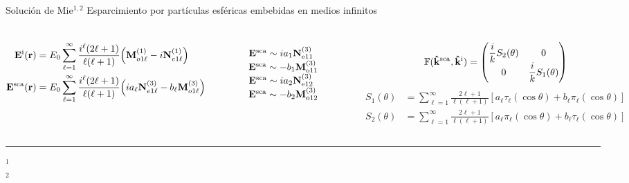 
\begin{frame}{Solución de Mie$^{1,2}$}
	{Esparcimiento por partículas esféricas embebidas en medios infinitos}
	\scriptsize
\vspace*{-2em}
	\begin{columns}
	 \scriptsize
	\begin{align*}
	\vb{E}^\text{i} (\vb{r}) &= E_0 \sum_{\ell = 1}^\infty\frac{i^\ell(2\ell+1)}{\ell(\ell+1)}\qty( \vb{M}_{o1\ell}^{(1)} -i \vb{N}_{e1\ell}^{(1)})\\
	\vb{E}^\text{sca} (\vb{r}) &= E_0 \sum_{\ell = 1}^\infty\frac{i^\ell(2\ell+1)}{\ell(\ell+1)}\qty(i a_\ell \vb{N}_{e1\ell}^{(3)} -b_\ell \vb{M}_{o1\ell}^{(3)})
	\end{align*}

	\begin{figure}
	    \fontsize{4}{5}\selectfont \hfill %
    $\vb{E}^\text{sca} \sim  i a_1 \vb{N}^{(3)}_{\text{e}11}$\hfill
    $\vb{E}^\text{sca} \sim  - b_1 \vb{M}^{(3)}_{\text{o}11}$\hfill
    $\vb{E}^\text{sca} \sim  i a_2 \vb{N}^{(3)}_{\text{e}12}$\hfill
    $\vb{E}^\text{sca} \sim  - b_2 \vb{M}^{(3)}_{\text{o}12}$\hfill\\[-2em]
	\def\svgwidth{1\textwidth}
\end{figure}
\scriptsize
$$ \mathbb{F}(\vu{k}^\text{sca},\vu{k}^\text{i})
            = \mqty(\dfrac{i}{k}S_2(\theta) & 0 \\
			0 & \dfrac{i}{k}S_1(\theta)  )$$
			\vspace*{-2.em}
\begin{align*}
S_1(\theta)  &= \sum_{\ell = 1}^\infty \frac{2\ell+1}{\ell(\ell+1)}
						[a_\ell\tau_\ell(\cos\theta)+b_\ell\pi_\ell(\cos\theta)]
\\
S_2(\theta) &= \sum_{\ell = 1}^\infty \frac{2\ell+1}{\ell(\ell+1)}
						[a_\ell\pi_\ell(\cos\theta)+b_\ell\tau_\ell(\cos\theta)]
\end{align*}

	 	 \centering
\begin{figure}
	\def\svgwidth{1\textwidth} \fontsize{4}{5}\selectfont
  \\[1em]
  \def\svgwidth{.95\textwidth} 
\end{figure}
	\end{columns}
	\vspace*{.5em}
	\noindent\rule{.25\textwidth}{0.4pt}
 \begin{spacing}{0}\fontsize{4}{5} \selectfont
	$^1$ \\
	$^2$ 
	\end{spacing}
\end{frame}
